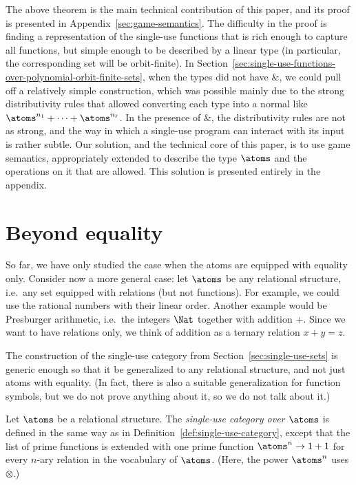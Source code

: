 The above theorem is the main technical contribution of this paper, and its proof is presented in Appendix~\ref{sec:game-semantics}. The difficulty in the proof is finding a representation of the single-use  functions that is rich enough to capture all functions, but simple enough to be described by a linear type (in particular, the corresponding set will be orbit-finite). In  Section~\ref{sec:single-use-functions-over-polynomial-orbit-finite-sets}, when the types did not have $\&$, we could pull off a relatively simple construction, which was possible mainly due to the strong distributivity rules that allowed converting each type into a normal like $\atoms^{n_1} + \cdots + \atoms^{n_\ell}$. In the presence of $\&$, the distributivity rules are not as strong, and the way in which a single-use program can interact with its input is rather subtle. 
Our solution, and the technical core of this paper, is to use game semantics, appropriately extended to describe the type $\atoms$ and the operations on it that are allowed. This solution is presented entirely in the appendix.









\section{Beyond equality}
\label{sec:beyond-equality}

So far, we have only studied the case when the atoms are equipped with equality only. Consider now a more general case: let $\atoms$ be any relational structure, i.e.~any set equipped with relations (but not functions). For example, we could use the rational numbers with their linear order. Another example would be Presburger arithmetic, i.e.~the integers $\Nat$ together with addition $+$. Since we want to have relations only, we think of addition as a ternary relation $x + y =z$. 

The construction of the single-use category from Section~\ref{sec:single-use-sets} is generic enough so that it be generalized to any relational structure, and not just atoms with equality. (In fact, there is also a suitable generalization for function symbols, but we do not prove anything about it, so we do not talk about it.)

\begin{definition}\label{def:single-use-category-relational-structures}
    Let $\atoms$ be a relational structure. The \emph{single-use category over $\atoms$} is defined in the same way as in Definition~\ref{def:single-use-category}, except that the list of prime functions is extended with one prime function  $\atoms^n \to 1 + 1$ 
        for every $n$-ary relation in the vocabulary of $\atoms$. (Here, the power $\atoms^n$ uses $\otimes$.)
\end{definition}


